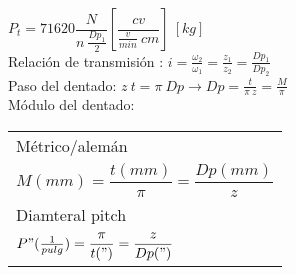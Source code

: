 \documentclass[11pt,a4paper]{article}
\begin{document}
\begin{multicols}{2}
\begin{cajita}
			 $P_t=71620\dfrac{N}{n~\frac{Dp_1}{2}} \left[\dfrac{cv}{\frac{v}{min}~cm}\right]~\left[kg\right]$\\ \vspace*{0.2cm}
			Relación de transmisión : $i=\frac{\omega_2}{\omega_1}=\frac{z_1}{z_2}=\frac{Dp_1}{Dp_2}$\\ \vspace*{0.2cm}
			Paso del dentado: $z~t=\pi~Dp \rightarrow Dp=\frac{t}{\pi~z}=\frac{M}{\pi}$\\\vspace*{0.2cm}
			Módulo del dentado:
			\begin{tabular}{l}
				Métrico/alemán\\
				$M(mm)=\dfrac{t(mm)}{\pi}=\dfrac{Dp(mm)}{z}$\\
				Diamteral pitch\\
				$P"(\frac{1}{pulg})=\dfrac{\pi}{t(")}=\dfrac{z}{Dp(")}$\\
			\end{tabular}


	\end{cajita}
	\end{multicols}
\end{document}
